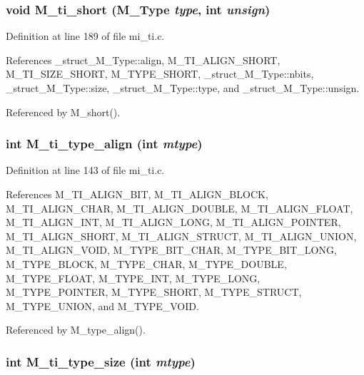 \subsubsection{\setlength{\rightskip}{0pt plus 5cm}void M\_\-ti\_\-short (\bf{M\_\-Type} {\em type}, int {\em unsign})}\label{mi__ti_8c_46c798f6d62ac8121a16af9f953d1f26}




Definition at line 189 of file mi\_\-ti.c.

References \_\-struct\_\-M\_\-Type::align, M\_\-TI\_\-ALIGN\_\-SHORT, M\_\-TI\_\-SIZE\_\-SHORT, M\_\-TYPE\_\-SHORT, \_\-struct\_\-M\_\-Type::nbits, \_\-struct\_\-M\_\-Type::size, \_\-struct\_\-M\_\-Type::type, and \_\-struct\_\-M\_\-Type::unsign.

Referenced by M\_\-short().
\subsubsection{\setlength{\rightskip}{0pt plus 5cm}int M\_\-ti\_\-type\_\-align (int {\em mtype})}\label{mi__ti_8c_5f11ee24540d5f0023156fe826b5b3e6}




Definition at line 143 of file mi\_\-ti.c.

References M\_\-TI\_\-ALIGN\_\-BIT, M\_\-TI\_\-ALIGN\_\-BLOCK, M\_\-TI\_\-ALIGN\_\-CHAR, M\_\-TI\_\-ALIGN\_\-DOUBLE, M\_\-TI\_\-ALIGN\_\-FLOAT, M\_\-TI\_\-ALIGN\_\-INT, M\_\-TI\_\-ALIGN\_\-LONG, M\_\-TI\_\-ALIGN\_\-POINTER, M\_\-TI\_\-ALIGN\_\-SHORT, M\_\-TI\_\-ALIGN\_\-STRUCT, M\_\-TI\_\-ALIGN\_\-UNION, M\_\-TI\_\-ALIGN\_\-VOID, M\_\-TYPE\_\-BIT\_\-CHAR, M\_\-TYPE\_\-BIT\_\-LONG, M\_\-TYPE\_\-BLOCK, M\_\-TYPE\_\-CHAR, M\_\-TYPE\_\-DOUBLE, M\_\-TYPE\_\-FLOAT, M\_\-TYPE\_\-INT, M\_\-TYPE\_\-LONG, M\_\-TYPE\_\-POINTER, M\_\-TYPE\_\-SHORT, M\_\-TYPE\_\-STRUCT, M\_\-TYPE\_\-UNION, and M\_\-TYPE\_\-VOID.

Referenced by M\_\-type\_\-align().
\subsubsection{\setlength{\rightskip}{0pt plus 5cm}int M\_\-ti\_\-type\_\-size (int {\em mtype})}\label{mi__ti_8c_fd58899d7ecdf39912cfffbbd4c757ea}




